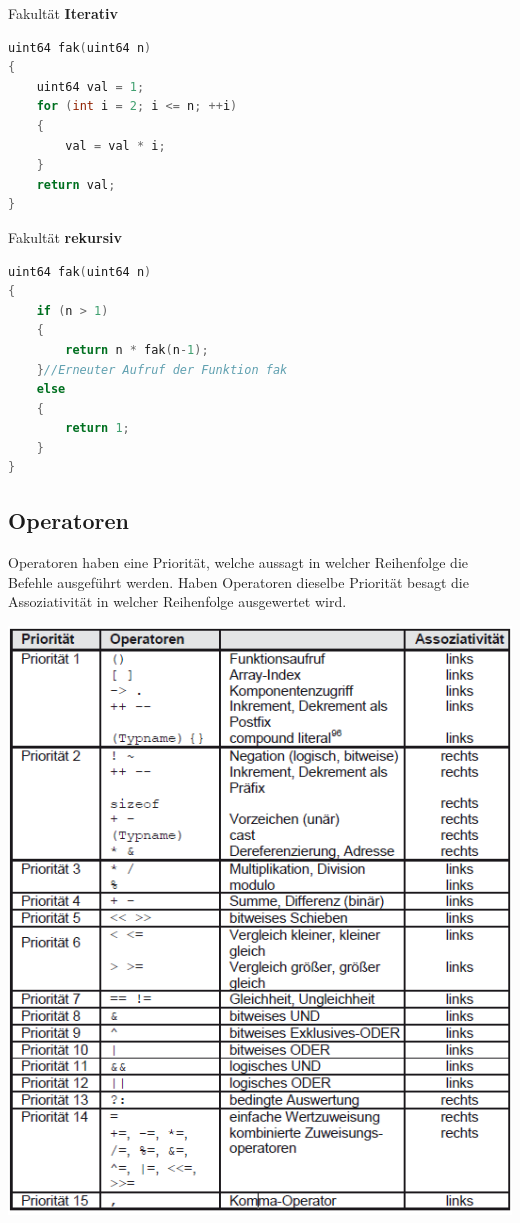 \noindent
\begin{minipage}[t]{0.5\columnwidth}
Fakultät \textbf{Iterativ}
\begin{lstlisting}[language = c]
uint64 fak(uint64 n)
{
    uint64 val = 1;
    for (int i = 2; i <= n; ++i)
    {
        val = val * i;
    }
    return val;
}


\end{lstlisting}
\end{minipage}
\begin{minipage}[t]{0.5\columnwidth}
Fakultät \textbf{rekursiv}
\begin{lstlisting}[language = c]
uint64 fak(uint64 n)
{
    if (n > 1)
    {
        return n * fak(n-1);
    }//Erneuter Aufruf der Funktion fak
    else
    {
        return 1;
    }
}
\end{lstlisting}
\end{minipage}
\subsection{Operatoren}

Operatoren haben eine Priorität, welche aussagt in welcher Reihenfolge die Befehle ausgeführt werden. Haben Operatoren dieselbe Priorität besagt die Assoziativität in welcher Reihenfolge ausgewertet wird.\newline

\includegraphics[width=1\columnwidth]{Pictures/Operators.png}

